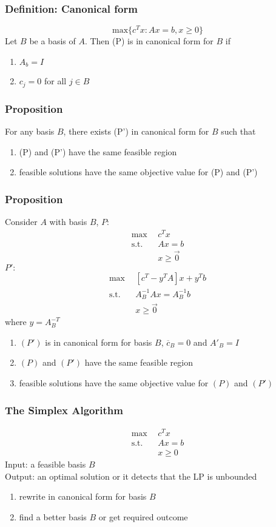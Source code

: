 \documentclass[11pt]{article}
\begin{document}
\subsubsection{Definition: Canonical form}
\[\text{max}\{c^Tx:Ax=b,x\geq0\}\]
Let $B$ be a basis of $A$. Then (P) is in canonical form for $B$ if 
\begin{enumerate}[P1]
  \item $A_b = I$
  \item $c_j=0$ for all $j\in B$
\end{enumerate}
\subsubsection{Proposition}
For any basis $B$, there exists (P') in canonical form for $B$ such that 
\begin{enumerate}
  \item (P) and (P') have the same feasible region
  \item feasible solutions have the same objective value for (P) and (P') 
\end{enumerate}
\subsubsection{Proposition}
Consider $A$ with basis $B$,
$P:$\\
\begin{align*}
  \text{max}\ \ &c^Tx \\
  \text{s.t.}\ \ &Ax=b \\
                 &x\geq\vec{0}
\end{align*}
$P':$\\
\begin{align*}
  \text{max}\ \ &[c^T-y^TA]x + y^Tb \\
  \text{s.t.}\ \ &A^{-1}_BAx = A^{-1}_Bb \\
                 &x\geq\vec{0}
\end{align*}
where $y=A^{-T}_B$ 
\begin{enumerate}
  \item $(P')$ is in canonical form for basis $B$, $\overline{c}_B = 0$ and $A'_B = I$
  \item $(P)$ and $(P')$ have the same feasible region 
  \item feasible solutions have the same objective value for $(P)$ and $(P')$
\end{enumerate}
\subsubsection{The Simplex Algorithm}
\begin{align*}
  \text{max}\ \ &c^Tx \\
  \text{s.t.}\ \ &Ax=b \\
                 &x\geq0
\end{align*}
Input: a feasible basis $B$ \\
Output: an optimal solution or it detects that the LP is unbounded 
\begin{enumerate}
  \item rewrite in canonical form for basis $B$
  \item find a better basis $B$ or get required outcome 
\end{enumerate}
\end{document}
